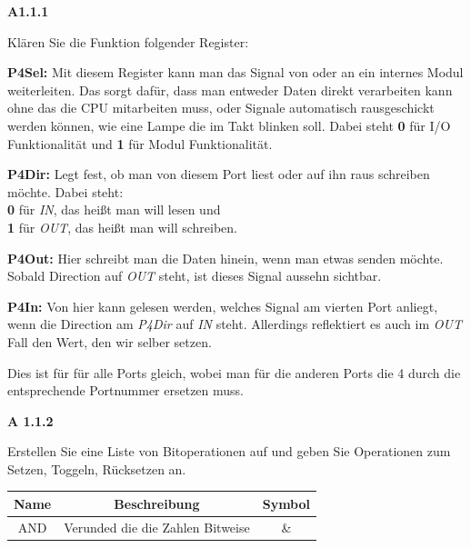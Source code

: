 \documentclass[a4paper,ngerman]{article}
\begin{document}
\begin{description}

\item{\bfseries A1.1.1}

Klären Sie die Funktion folgender Register:

\begin{description}

\item{\bfseries P4Sel:} Mit diesem Register kann man das Signal von oder an ein internes Modul weiterleiten. Das sorgt dafür, dass man entweder Daten direkt verarbeiten kann ohne das die CPU mitarbeiten muss, oder Signale automatisch rausgeschickt werden können, wie eine Lampe die im Takt blinken soll. Dabei steht \textbf{0} für I/O Funktionalität und \textbf{1} für Modul Funktionalität.

\item{\bfseries P4Dir:}  Legt fest, ob man von diesem Port liest oder auf ihn raus schreiben möchte. Dabei steht:\\
\textbf{0} für \emph{IN}, das heißt man will lesen und\\
\textbf{1} für \emph{OUT}, das heißt man will schreiben. 

\item{\bfseries P4Out:} Hier schreibt man die Daten hinein, wenn man etwas senden möchte. Sobald Direction auf \emph{OUT} steht, ist dieses Signal aussehn sichtbar.


\item{\bfseries P4In:} Von hier kann gelesen werden, welches Signal am vierten Port anliegt, wenn die Direction am \emph{P4Dir} auf \emph{IN} steht. Allerdings reflektiert es auch im \emph{OUT} Fall den Wert, den wir selber setzen.

\end{description}

Dies ist für für alle Ports gleich, wobei man für die anderen Ports die 4 durch die entsprechende Portnummer ersetzen muss.

\item{\bfseries A 1.1.2}

Erstellen Sie eine Liste von Bitoperationen auf und geben Sie Operationen zum Setzen, Toggeln, Rücksetzen an.

\begin{tabular}{c|c|c}

Name & Beschreibung & Symbol\\
\hline

AND & Verunded die die Zahlen Bitweise &  \&\\


\end{tabular}
\end{description}
\end{document}
